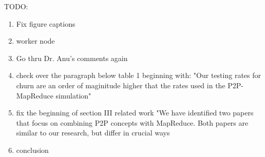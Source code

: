 \documentclass[10pt, conference, compsocconf]{IEEEtran}
\begin{document}




TODO:
\begin{enumerate}
    \item Fix figure captions
    \item worker node
    \item Go thru Dr. Anu's comments again
    \item check over the paragraph below table 1 beginning with: "Our testing rates for churn are an order of maginitude higher that the rates used in the P2P-MapReduce simulation"
    \item fix the beginning of section III related work "We have identified two papers that focus on combining P2P concepts with MapReduce. Both papers are similar to our research, but differ in crucial ways
    \item conclusion

\end{enumerate}





\end{document}
